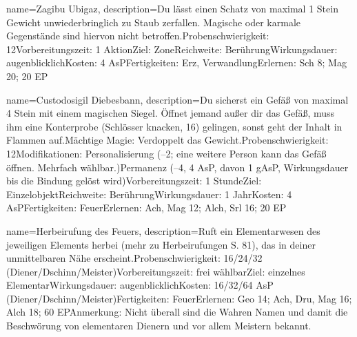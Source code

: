 {
    name={Zagibu Ubigaz},
    description={Du lässt einen Schatz von maximal 1 Stein Gewicht unwiederbringlich zu Staub zerfallen. Magische oder karmale Gegenstände sind hiervon nicht betroffen.\newline Probenschwierigkeit: 12\newline Vorbereitungszeit: 1 Aktion\newline Ziel: Zone\newline Reichweite: Berührung\newline Wirkungsdauer: augenblicklich\newline Kosten: 4 AsP\newline Fertigkeiten: Erz, Verwandlung\newline Erlernen: Sch 8; Mag 20; 20 EP}
}


{
    name={Custodosigil Diebesbann},
    description={Du sicherst ein Gefäß von maximal 4 Stein mit einem magischen Siegel. Öffnet jemand außer dir das Gefäß, muss ihm eine Konterprobe (Schlösser knacken, 16) gelingen, sonst geht der Inhalt in Flammen auf.\newline Mächtige Magie: Verdoppelt das Gewicht.\newline Probenschwierigkeit: 12\newline Modifikationen: Personalisierung (–2; eine weitere Person kann das Gefäß öffnen. Mehrfach wählbar.)\newline Permanenz (–4, 4 AsP, davon 1 gAsP, Wirkungsdauer bis die Bindung gelöst wird)\newline Vorbereitungszeit: 1 Stunde\newline Ziel: Einzelobjekt\newline Reichweite: Berührung\newline Wirkungsdauer: 1 Jahr\newline Kosten: 4 AsP\newline Fertigkeiten: Feuer\newline Erlernen: Ach, Mag 12; Alch, Srl 16; 20 EP}
}


{
    name={Herbeirufung des Feuers},
    description={Ruft ein Elementarwesen des jeweiligen Elements herbei (mehr zu Herbeirufungen S. 81), das in deiner unmittelbaren Nähe erscheint.\newline Probenschwierigkeit: 16/24/32 (Diener/Dschinn/Meister)\newline Vorbereitungszeit: frei wählbar\newline Ziel: einzelnes Elementar\newline Wirkungsdauer: augenblicklich\newline Kosten: 16/32/64 AsP (Diener/Dschinn/Meister)\newline Fertigkeiten: Feuer\newline Erlernen: Geo 14; Ach, Dru, Mag 16; Alch 18; 60 EP\newline Anmerkung: Nicht überall sind die Wahren Namen und damit die Beschwörung von elementaren Dienern und vor allem Meistern bekannt. }
}


